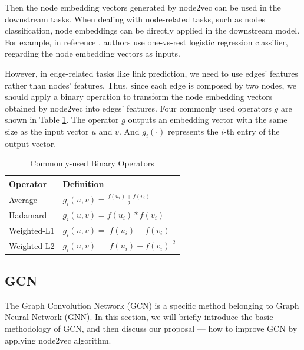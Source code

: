 \documentclass[sigconf]{acmart}
\begin{document}
Then the node embedding vectors generated by node2vec can be used in the downstream tasks. When dealing with node-related tasks, such as nodes classification, node embeddings can be directly applied in the downstream model. For example, in reference \cite{node2vec}, authors use one-vs-rest logistic regression classifier, regarding the node embedding vectors as inputs.

However, in edge-related tasks like link prediction, we need to use edges' features rather than nodes' features. Thus, since each edge is composed by two nodes, we should apply a binary operation to transform the node embedding vectors obtained by node2vec into edges' features. Four commonly used operators $g$ are shown in Table \ref{linkop}. The operator $g$ outputs an embedding vector with the same size as the input vector $u$ and $v$. And $g_i(\cdot)$ represents the $i$-th entry of the output vector. 

\begin{table}[!ht]
	\caption{Commonly-used Binary Operators}
	\label{linkop}
	\centering
	\begin{tabular}{ll}
		\toprule
		\textbf{Operator} &  \textbf{Definition} \\
		\midrule
		Average & $g_i(u,v)=\frac{f(u_i)+f(v_i)}{2}$ \\
		Hadamard & $g_i(u,v)=f(u_i)*f(v_i)$ \\
		Weighted-L1  & $g_i(u,v)=|f(u_i)-f(v_i)|$  \\
		Weighted-L2 & $g_i(u,v)=|f(u_i)-f(v_i)|^2$  \\
		\bottomrule
	\end{tabular}
\end{table}

\subsection{GCN}
The Graph Convolution Network (GCN) is a specific method belonging to Graph Neural Network (GNN). In this section,  we will briefly introduce the basic methodology of GCN, and then discuss our proposal --- how to improve GCN by applying node2vec algorithm. 
\end{document}

